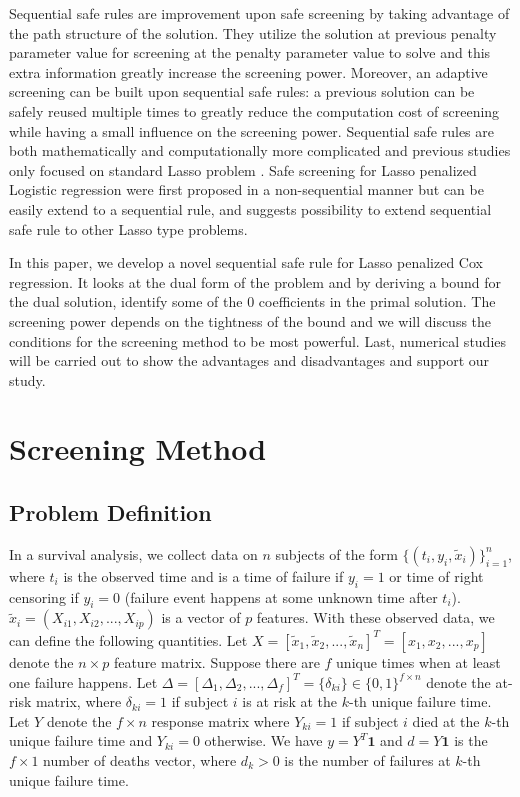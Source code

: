 Sequential safe rules are improvement upon safe screening by taking advantage of the path structure of the solution. They utilize the solution at previous penalty parameter value for screening at the penalty parameter value to solve and this extra information greatly increase the screening power. Moreover, an adaptive screening can be built upon sequential safe rules: a previous solution can be safely reused multiple times to greatly reduce the computation cost of screening while having a small influence on the screening power. Sequential safe rules are both mathematically and computationally more complicated and previous studies only focused on standard Lasso problem \citep{wang2013lasso}. Safe screening for Lasso penalized Logistic regression \citep{wang2014safe} were first proposed in a non-sequential manner but can be easily extend to a sequential rule, and suggests possibility to extend sequential safe rule to other Lasso type problems.

In this paper, we develop a novel sequential safe rule for Lasso penalized Cox regression. It looks at the dual form of the problem and by deriving a bound for the dual solution, identify some of the 0 coefficients in the primal solution. The screening power depends on the tightness of the bound and we will discuss the conditions for the screening method to be most powerful. Last, numerical studies will be carried out to show the advantages and disadvantages and support our study.

\section{Screening Method}
\subsection{Problem Definition}

In a survival analysis, we collect data on $n$ subjects of the form $\{(t_i,y_i,\tilde{x}_i)\}_{i=1}^n$, where $t_i$ is the observed time and is a time of failure if $y_i=1$ or time of right censoring if $y_i=0$ (failure event happens at some unknown time after $t_i$). $\tilde{x}_i=(X_{i1},X_{i2},...,X_{ip})$ is a vector of $p$ features. With these observed data, we can define the following quantities. Let $X=[\tilde{x}_1,\tilde{x}_2,...,\tilde{x}_n]^T=[x_1,x_2,...,x_p]$ denote the $n\times p$ feature matrix. Suppose there are $f$ unique times when at least one failure happens. Let  $\Delta=[\Delta_1,\Delta_2,...,\Delta_f]^T=\{\delta_{ki}\}\in\{0,1\}^{f\times n}$ denote the at-risk matrix, where $\delta_{ki}=1$ if subject $i$ is at risk at the $k$-th unique failure time. Let $Y$ denote the $f\times n$ response matrix where $Y_{ki}=1$ if subject $i$ died at the $k$-th unique failure time and $Y_{ki}=0$ otherwise. We have $y=Y^T\mathbf{1}$ and $d=Y\mathbf{1}$ is the $f\times 1$ number of deaths vector, where $d_k>0$ is the number of failures at $k$-th unique failure time.

